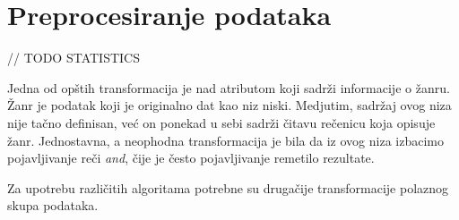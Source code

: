 \section{Preprocesiranje podataka}
\label{sec:Preprocesiranje}

// TODO STATISTICS

Jedna od op\v{s}tih transformacija je nad atributom koji sadr\v{z}i informacije o \v{z}anru. \v{Z}anr je podatak koji je originalno dat kao niz niski. Medjutim, sadr\v{z}aj ovog niza nije ta\v{c}no definisan, ve\'c{} on ponekad u sebi sadr\v{z}i \v{c}itavu re\v{c}enicu koja opisuje \v{z}anr. Jednostavna, a neophodna transformacija je bila da iz ovog niza izbacimo pojavljivanje re\v{c}i \emph{and}, \v{c}ije je \v{c}esto pojavljivanje remetilo rezultate.

Za upotrebu razli\v{c}itih algoritama potrebne su druga\v{c}ije transformacije polaznog skupa podataka.
